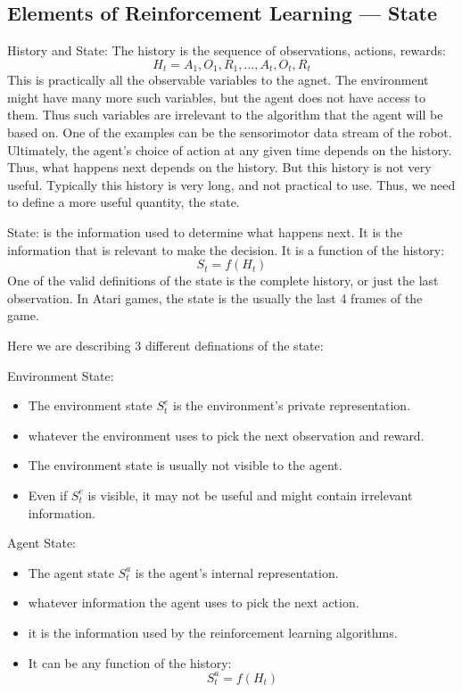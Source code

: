 \subsection{Elements of Reinforcement Learning --- State}
History and State:
The history is the sequence of observations, actions, rewards:
\[
    H_t = A_1, O_1, R_1, \dots, A_t, O_t, R_t  
\]
This is practically all the observable variables to the agnet. The environment might have many more
such variables, but the agent does not have access to them. Thus such variables are irrelevant to the
algorithm that the agent will be based on. One of the examples can be the sensorimotor data stream
of the robot.
Ultimately, the agent's choice of action at any given time depends on the history. Thus, what
happens next depends on the history. 
But this history is not very useful. Typically this history is very long, and not practical to
use. Thus, we need to define a more useful quantity, the state.

State: is the information used to determine what happens next. It is the information that is
relevant to make the decision. It is a function of the history:
\[
    S_t = f(H_t)
\]
One of the valid definitions of the state is the complete history, or just the last observation. 
In Atari games, the state is the usually the last 4 frames of the game.

Here we are describing 3 different definations of the state:

Environment State: 
\begin{itemize}
    \item The environment state \(S_t^e\) is the environment's private representation.
    \item whatever the environment uses to pick the next observation and reward. 
    \item The environment state is usually not visible to the agent.
    \item Even if \(S_t^e\) is visible, it may not be useful and might contain irrelevant information.
\end{itemize}

Agent State:
\begin{itemize}
    \item The agent state \(S_t^a\) is the agent's internal representation.
    \item whatever information the agent uses to pick the next action.
    \item it is the information used by the reinforcement learning algorithms.
    \item It can be any function of the history:
    \[
        S_t^a = f(H_t)  
    \]
\end{itemize}

